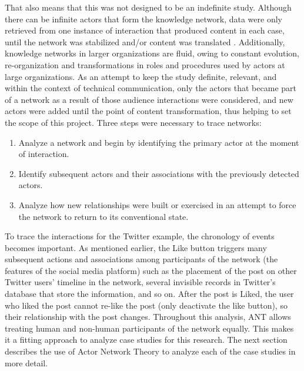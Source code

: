 That also means that this was not designed to be an indefinite study. Although there can be infinite actors that form the knowledge network, data were only retrieved from one instance of interaction that produced content in each case, until the network was stabilized and/or content was translated \cite{callon2007some}. Additionally, knowledge networks in larger organizations are fluid, owing to constant evolution, re-organization and transformations in roles and procedures used by actors at large organizations. As an attempt to keep the study definite, relevant, and within the context of technical communication, only the actors that became part of a network as a result of those audience interactions were considered, and new actors were added until the point of content transformation, thus helping to set the scope of this project. Three steps were necessary to trace networks:

\begin{enumerate}
  \item Analyze a network and begin by identifying the primary actor at the moment of interaction.
  \item Identify subsequent actors and their associations with the previously detected actors.
  \item Analyze how new relationships were built or exercised in an attempt to force the network to return to its conventional state.
\end{enumerate}

To trace the interactions for the Twitter example, the chronology of events becomes important. As mentioned earlier, the Like button triggers many subsequent actions and associations among participants of the network (the features of the social media platform) such as the placement of the post on other Twitter users' timeline in the network, several invisible records in Twitter's database that store the information, and so on. After the post is Liked, the user who liked the post cannot re-like the post (only deactivate the like button), so their relationship with the post changes. Throughout this analysis, ANT allows treating human and non-human participants of the network equally. This makes it a fitting approach to analyze case studies for this research. The next section describes the use of Actor Network Theory to analyze each of the case studies in more detail.


